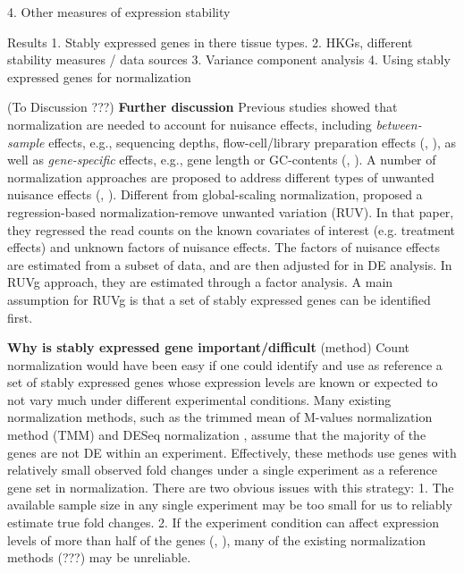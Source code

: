 \documentclass[11pt, a4paper]{article}
\begin{document}
4. Other measures of expression stability

Results
1. Stably expressed genes in there tissue types.
2. HKGs, different stability measures / data sources
3. Variance component analysis
4. Using stably expressed genes for normalization


(To Discussion ???) {\bf Further discussion} Previous studies showed that
normalization are needed to account for nuisance effects, including
\textit{between-sample} effects, e.g., sequencing depths, flow-cell/library
preparation effects (\cite{bullard2010evaluation},
\cite{robinson2010scaling}), as well as \textit{gene-specific} effects, e.g.,
gene length or GC-contents (\cite{risso2011gc}, \cite{hansen2012removing}). A
number of normalization approaches are proposed to address different types of
unwanted nuisance effects (\cite{dillies2013comprehensive},
\cite{risso2014nat}). Different from global-scaling normalization,
\cite{risso2014nat}  proposed a regression-based normalization-remove unwanted
variation (RUV).  In that paper, they regressed the read counts on the known
covariates of interest (e.g. treatment effects) and unknown factors of
nuisance effects. The factors of nuisance effects are estimated from a subset
of data, and are then adjusted for in DE analysis. In RUVg approach, they are
estimated through a factor analysis. A main assumption for RUVg is that a set
of stably expressed genes can be identified first.



\newpage
\textbf{Why is stably expressed gene important/difficult}
(method) Count normalization would have been easy if one could identify and use as
reference a set of stably expressed genes whose expression levels are known or
expected to not vary much under different experimental conditions.  
Many existing normalization methods, such as the trimmed mean of M-values
normalization method (TMM) \citep{robinson2010scaling} and DESeq normalization
\citep{anders2010differential}, assume that the majority of the genes are not
DE within an experiment. Effectively, these methods use genes with relatively
small observed fold changes under a single experiment as a reference gene set
in normalization. There are two obvious issues with this strategy: 1. The
available sample size in any single experiment may be too small for us to
reliably estimate true fold changes. 2.  If the experiment condition can
affect expression levels of more than half of the genes
(\cite{loven2012revisiting}, \cite{wu2013use}), many of the existing
normalization methods (???) may be unreliable.  
\end{document}
